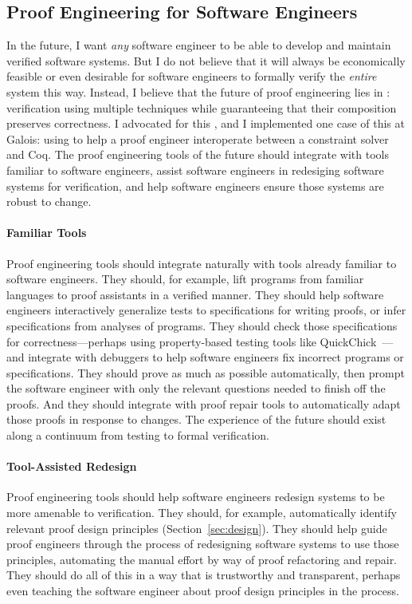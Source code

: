 \subsection*{Proof Engineering for Software Engineers}

In the future, I want \textit{any} software engineer to be able to develop and maintain verified software systems.
But I do not believe that it will always be economically feasible or even desirable for software engineers to formally verify 
the \textit{entire} system this way.
Instead, I believe that the future of proof engineering lies in :
verification using multiple techniques while guaranteeing that their composition preserves correctness.
I advocated for this , and I implemented one case of this at Galois: using
\sysnamelong to help a proof engineer interoperate between a constraint solver and Coq.
The proof engineering tools of the future should integrate with tools familiar to software engineers,
assist software engineers in redesiging software systems for verification,
and help software engineers ensure those systems are robust to change.

\paragraph{Familiar Tools}
Proof engineering tools should integrate naturally with tools already familiar to software engineers.
They should, for example, lift programs from familiar languages to proof assistants in a verified manner.
They should help software engineers interactively generalize tests to specifications for writing proofs,
or infer specifications from analyses of programs.
They should check those specifications for correctness---perhaps using property-based testing tools 
like QuickChick~\cite{Paraskevopoulou2015, lampropoulos2017generating}---and integrate with debuggers to help software engineers 
fix incorrect programs or specifications.
They should prove as much as possible automatically, then prompt the software engineer with only the relevant questions
needed to finish off the proofs.
And they should integrate with proof repair tools to automatically adapt those proofs in response to changes.
The experience of the future should exist along a continuum from testing to formal verification.

\paragraph{Tool-Assisted Redesign} 
Proof engineering tools should help software engineers redesign systems to be more amenable to verification.
They should, for example, automatically identify relevant proof design principles (Section~\ref{sec:design}).
They should help guide proof engineers through the process of redesigning software systems to use those principles,
automating the manual effort by way of proof refactoring and repair.
They should do all of this in a way that is trustworthy and transparent,
perhaps even teaching the software engineer about proof design principles in the process.

